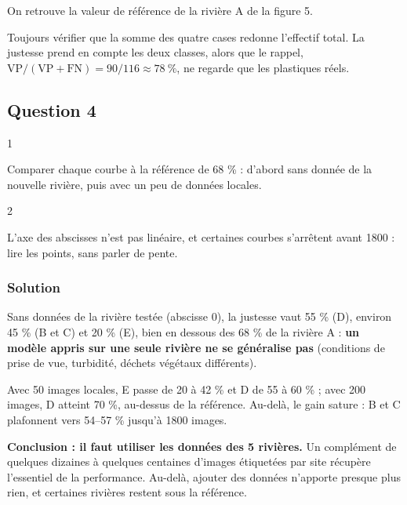 \documentclass[11pt,a4paper]{article}
\newcommand{\equationajustee}[1]{%
  \sbox{\boiteequation}{$\displaystyle #1$}%
  \ifdim\wd\boiteequation>\linewidth
    \[\resizebox{\linewidth}{!}{\usebox{\boiteequation}}\]%
  \else
    \[#1\]%
  \fi}
\begin{document}
\equationajustee{\boxed{\text{justesse}=68\ \%}}

On retrouve la valeur de référence de la rivière A de la figure 5.

\begin{methode}

Toujours vérifier que la somme des quatre cases redonne l'effectif total. La justesse prend en compte les deux classes, alors que le rappel, \(\mathrm{VP}/(\mathrm{VP}+\mathrm{FN})=90/116\approx78\ \%\), ne regarde que les plastiques réels.

\end{methode}

\hypertarget{question-4}{%
\subsection{Question 4}\label{question-4}}

\begin{indication}{1}

Comparer chaque courbe à la référence de 68 \% : d'abord sans donnée de la nouvelle rivière, puis avec un peu de données locales.

\end{indication}

\begin{indication}{2}

L'axe des abscisses n'est pas linéaire, et certaines courbes s'arrêtent avant 1800 : lire les points, sans parler de pente.

\end{indication}

\hypertarget{solution-3}{%
\subsubsection{Solution}\label{solution-3}}

Sans données de la rivière testée (abscisse 0), la justesse vaut 55 \% (D), environ 45 \% (B et C) et 20 \% (E), bien en dessous des 68 \% de la rivière A : \textbf{un modèle appris sur une seule rivière ne se généralise pas} (conditions de prise de vue, turbidité, déchets végétaux différents).

Avec 50 images locales, E passe de 20 à 42 \% et D de 55 à 60 \% ; avec 200 images, D atteint 70 \%, au-dessus de la référence. Au-delà, le gain sature : B et C plafonnent vers 54--57 \% jusqu'à 1800 images.

\textbf{Conclusion : il faut utiliser les données des 5 rivières.} Un complément de quelques dizaines à quelques centaines d'images étiquetées par site récupère l'essentiel de la performance. Au-delà, ajouter des données n'apporte presque plus rien, et certaines rivières restent sous la référence.
\end{document}

